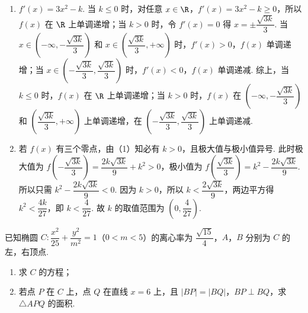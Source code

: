 \begin{solution}
\begin{enumerate}
    \item \(f'(x)=3x^2-k\). 当 \(k\le 0\) 时，对任意 \(x\in\R\)，\(f'(x)=3x^2-k\ge0\)，所以 \(f(x)\) 在 \(\R\) 上单调递增；当 \(k>0\) 时，令 \(f'(x)=0\) 得 \(x=\pm\dfrac{\sqrt{3k}}{3}\). 当 \(x\in\left(-\infty,-\dfrac{\sqrt{3k}}{3}\right)\) 和 \(x\in\left(\dfrac{\sqrt{3k}}{3},+\infty\right)\) 时，\(f'(x)>0\)，\(f(x)\) 单调递增；当 \(x\in\left(-\dfrac{\sqrt{3k}}{3},\dfrac{\sqrt{3k}}{3}\right)\) 时，\(f'(x)<0\)，\(f(x)\) 单调递减. 综上，当 \(k\le 0\) 时，\(f(x)\) 在 \(\R\) 上单调递增；当 \(k>0\) 时，\(f(x)\) 在 \(\left(-\infty,-\dfrac{\sqrt{3k}}{3}\right)\) 和 \(\left(\dfrac{\sqrt{3k}}{3},+\infty\right)\) 上单调递增，在 \(\left(-\dfrac{\sqrt{3k}}{3},\dfrac{\sqrt{3k}}{3}\right)\) 上单调递减.
    \item 若 \(f(x)\) 有三个零点，由（1）知必有 \(k>0\)，且极大值与极小值异号. 此时极大值为 \(f\left(-\dfrac{\sqrt{3k}}{3}\right)=\dfrac{2k\sqrt{3k}}{9}+k^2>0\)，极小值为 \(f\left(\dfrac{\sqrt{3k}}{3}\right)=k^2-\dfrac{2k\sqrt{3k}}{9}\). 所以只需 \(k^2-\dfrac{2k\sqrt{3k}}{9}<0\). 因为 \(k>0\)，所以 \(k<\dfrac{2\sqrt{3k}}{9}\)，两边平方得 \(k^2<\dfrac{4k}{27}\)，即 \(k<\dfrac{4}{27}\). 故 \(k\) 的取值范围为 \(\left(0,\dfrac{4}{27}\right)\).
\end{enumerate}
\end{solution}

\begin{problem}
已知椭圆 \(C:\dfrac{x^2}{25}+\dfrac{y^2}{m^2}=1\)（\(0<m<5\)）的离心率为 \(\dfrac{\sqrt{15}}{4}\)，\(A\)，\(B\) 分别为 \(C\) 的左，右顶点.

\begin{enumerate}
    \item 求 \(C\) 的方程；
    \item 若点 \(P\) 在 \(C\) 上，点 \(Q\) 在直线 \(x=6\) 上，且 \(|BP|=|BQ|\)，\(BP\perp BQ\)，求 \(\triangle APQ\) 的面积.
\end{enumerate}
\end{problem}

